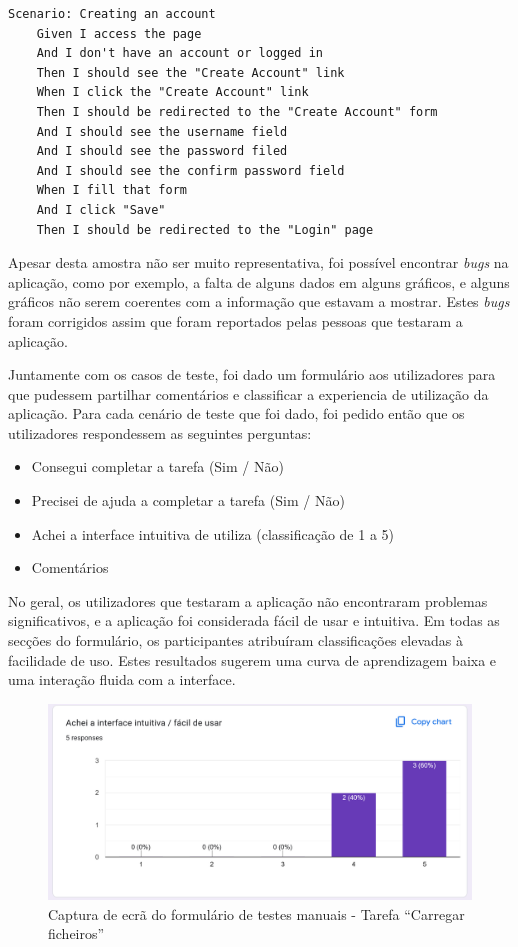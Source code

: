 \begin{lstlisting}[language=Gherkin, caption={Excerto do código \textit{Gherkin} do cenário de teste para a criação de uma conta}]
Scenario: Creating an account
	Given I access the page 
	And I don't have an account or logged in
	Then I should see the "Create Account" link
	When I click the "Create Account" link
	Then I should be redirected to the "Create Account" form
	And I should see the username field
	And I should see the password filed
	And I should see the confirm password field
	When I fill that form
	And I click "Save"
	Then I should be redirected to the "Login" page
\end{lstlisting}

Apesar desta amostra não ser muito representativa, foi possível encontrar \textit{bugs} na aplicação, como por exemplo, a falta de alguns dados em alguns gráficos, e alguns gráficos não serem coerentes com a informação que estavam a mostrar. Estes \textit{bugs} foram corrigidos assim que foram reportados pelas pessoas que testaram a aplicação.

Juntamente com os casos de teste, foi dado um formulário aos utilizadores para que pudessem partilhar comentários e classificar a experiencia de utilização da aplicação. Para cada cenário de teste que foi dado, foi pedido então que os utilizadores respondessem as seguintes perguntas:

\begin{itemize}
    \item Consegui completar a tarefa (Sim / Não)
    \item Precisei de ajuda a completar a tarefa (Sim / Não)
    \item Achei a interface intuitiva de utiliza (classificação de 1 a 5)
    \item Comentários
\end{itemize}



No geral, os utilizadores que testaram a aplicação não encontraram problemas significativos, e a aplicação foi considerada fácil de usar e intuitiva. Em todas as secções do formulário, os participantes atribuíram classificações elevadas à facilidade de uso. Estes resultados sugerem uma curva de aprendizagem baixa e uma interação fluida com a interface.

\begin{figure}[H]
\centering
\includegraphics[max width=\textwidth]{./img/form2}
\caption{Captura de ecrã do formulário de testes manuais - Tarefa ``Carregar ficheiros''}
\label{fig:form2}
\end{figure}

